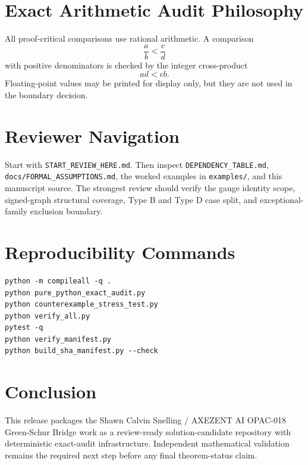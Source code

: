 \documentclass[11pt]{article}
\begin{document}
\section{Exact Arithmetic Audit Philosophy}
All proof-critical comparisons use rational arithmetic. A comparison
\[
\frac{a}{b}<\frac{c}{d}
\]
with positive denominators is checked by the integer cross-product
\[
ad<cb.
\]
Floating-point values may be printed for display only, but they are not used in the boundary decision.

\section{Reviewer Navigation}
Start with \texttt{START\_REVIEW\_HERE.md}. Then inspect \texttt{DEPENDENCY\_TABLE.md}, \texttt{docs/FORMAL\_ASSUMPTIONS.md}, the worked examples in \texttt{examples/}, and this manuscript source. The strongest review should verify the gauge identity scope, signed-graph structural coverage, Type B and Type D case split, and exceptional-family exclusion boundary.

\section{Reproducibility Commands}
\begin{verbatim}
python -m compileall -q .
python pure_python_exact_audit.py
python counterexample_stress_test.py
python verify_all.py
pytest -q
python verify_manifest.py
python build_sha_manifest.py --check
\end{verbatim}

\section{Conclusion}
This release packages the Shawn Calvin Snelling / AXEZENT AI OPAC-018 Green-Schur Bridge work as a review-ready solution-candidate repository with deterministic exact-audit infrastructure. Independent mathematical validation remains the required next step before any final theorem-status claim.
\end{document}
